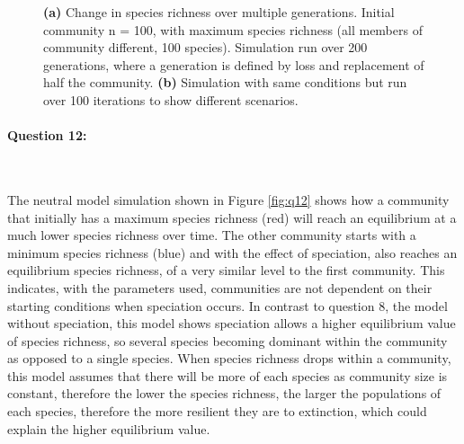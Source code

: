 \documentclass{article}
\begin{document}
\begin{figure}[H]
\begin{subfigure}[t]{0.49\linewidth}
				\caption{}
			\end{subfigure}
			\caption{\textbf{(a)} Change in species richness over multiple generations. Initial community n = 100, with maximum species richness (all members of community different, 100 species). Simulation run over 200 generations, where a generation is defined by loss and replacement of half the community. \textbf{(b)} Simulation with same conditions but run over 100 iterations to show different scenarios.}
			\label{fig:qu8}
	\end{figure}

\newpage
\paragraph{Question 12:}\

\noindent \newline The neutral model simulation shown in Figure \ref{fig:q12} shows how a community that initially has a maximum species richness (red) will reach an equilibrium at a much lower species richness over time. The other community starts with a minimum species richness (blue) and with the effect of speciation, also reaches an equilibrium species richness, of a very similar level to the first community. This indicates, with the parameters used, communities are not dependent on their starting conditions when speciation occurs. In contrast to question 8, the model without speciation, this model shows speciation allows a higher equilibrium value of species richness, so several species becoming dominant within the community as opposed to a single species. When species richness drops within a community, this model assumes that there will be more of each species as community size is constant, therefore the lower the species richness, the larger the populations of each species, therefore the more resilient they are to extinction, which could explain the higher equilibrium value. \newline
\end{document}
